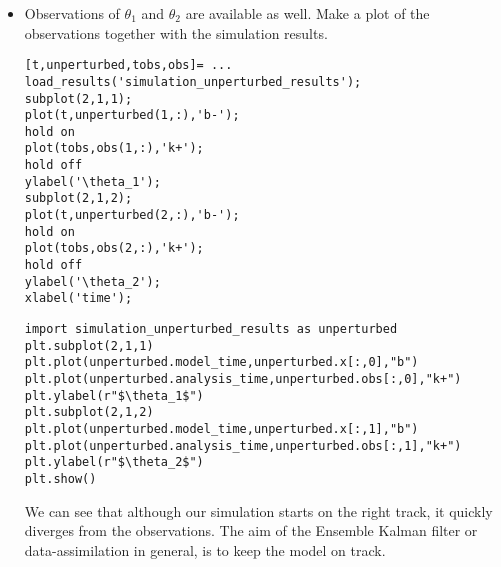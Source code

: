 \begin{itemize}
\begin{lstlisting}[style=PythonStyle,frame=single,caption={Python}]
import ensemble
import simulation_ensemble_results as res
(t,ens)=ensemble.reshape_ensemble(res)
ens1=ens[:,0,:] #note we start counting at 0
ens2=ens[:,1,:]
plt.subplot(2,1,1)
plt.plot(t[1:],ens1,"b")
plt.ylabel(r"$\theta_1$")
plt.subplot(2,1,2)
plt.plot(t[1:],ens2,"b")
plt.ylabel(r"$\theta_2$")
plt.show()
\end{lstlisting}
      
      \item Observations of $\theta_1$ and $\theta_2$ are available as well. Make a plot of
      the observations together with the simulation results.
\ifshowmatlab
\begin{lstlisting}[style=MatlabStyle,frame=single,caption={Matlab}]
[t,unperturbed,tobs,obs]= ...
load_results('simulation_unperturbed_results');
subplot(2,1,1);
plot(t,unperturbed(1,:),'b-');
hold on
plot(tobs,obs(1,:),'k+');
hold off
ylabel('\theta_1');
subplot(2,1,2);
plot(t,unperturbed(2,:),'b-');
hold on
plot(tobs,obs(2,:),'k+');
hold off
ylabel('\theta_2');
xlabel('time');
\end{lstlisting}
\fi
\begin{lstlisting}[style=PythonStyle,frame=single,caption={Python}]
import simulation_unperturbed_results as unperturbed
plt.subplot(2,1,1)
plt.plot(unperturbed.model_time,unperturbed.x[:,0],"b") 
plt.plot(unperturbed.analysis_time,unperturbed.obs[:,0],"k+")
plt.ylabel(r"$\theta_1$")
plt.subplot(2,1,2)
plt.plot(unperturbed.model_time,unperturbed.x[:,1],"b")
plt.plot(unperturbed.analysis_time,unperturbed.obs[:,1],"k+")
plt.ylabel(r"$\theta_2$")
plt.show()
\end{lstlisting}
      
We can see that although our simulation starts on the right track, it quickly diverges from the observations.
The aim of the Ensemble Kalman filter or data-assimilation in general, is to keep the model on track. 
\end{itemize}
